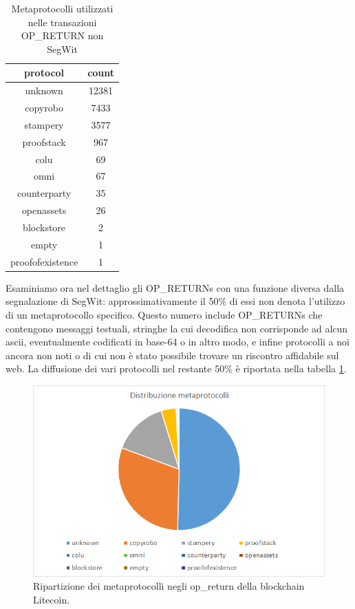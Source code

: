 \begin{table}
	\begin{center}
		\begin{tabular}{|c|c|}
			\hline 
			\textbf{protocol}& \textbf{count}  \\ 
			\hline 
		unknown	&  12381\\ 
			\hline 
		copyrobo	&  7433\\ 
			\hline 
		stampery	& 3577 \\ 
			\hline 
		proofstack	& 967 \\ 
			\hline 
		colu	& 69 \\ 
			\hline 
		omni	& 67 \\ 
			\hline 
		counterparty	& 35 \\ 
			\hline 
		openassets	& 26 \\ 
			\hline 
		blockstore	& 2 \\ 
			\hline 
		empty	& 1 \\ 
			\hline 
		proofofexistence	& 1 \\ 
			\hline 
		\end{tabular}
		\caption{Metaprotocolli utilizzati nelle transazioni OP\_RETURN non SegWit}
		\label{protocols}
	\end{center}
\end{table}

Esaminiamo ora nel dettaglio gli OP\_RETURNs con una funzione diversa dalla segnalazione di SegWit: approssimativamente il 50\% di essi non denota l’utilizzo di un metaprotocollo specifico. Questo numero include OP\_RETURNs che contengono messaggi testuali, stringhe la cui decodifica non corrisponde ad alcun ascii, eventualmente codificati in base-64 o in altro modo, e infine protocolli a noi ancora non noti o di cui non è stato possibile trovare un riscontro affidabile sul web.
La diffusione dei vari protocolli nel restante 50\% è riportata nella tabella \ref{protocols}.

\begin{figure}
	\centering
	\includegraphics[width=1.0\linewidth]{images/distribuzioneopreturn}
	\caption{Ripartizione dei metaprotocolli negli op\_return della blockchain Litecoin.}
	\label{fig:distribuzioneopreturn}
\end{figure}

